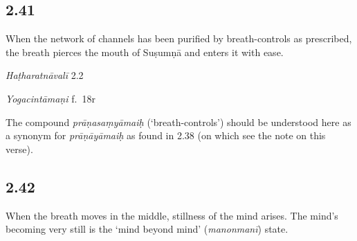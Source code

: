 \begin{ekdosis}
\begin{philcomm}[hp02_040]
\end{philcomm}

\subsection*{2.41}
\begin{translation}[hp02_041]
When the network of channels has been purified by breath-controls as prescribed, the breath pierces the mouth of Suṣumṇā and enters it with ease.
\end{translation}


\begin{testimonia}[hp02_041]
\emph{Haṭharatnāvalī} 2.2

\begin{versinnote}
\end{versinnote}

\emph{Yogacintāmaṇi} f.~18r

\begin{versinnote}
\end{versinnote}


\end{testimonia}

\begin{philcomm}[hp02_041]
The compound \emph{prāṇasaṃyāmaiḥ} (‘breath-controls’) should be understood here as a synonym for \emph{prāṇāyāmaiḥ} as found in 2.38 (on which see the note on this verse).
\end{philcomm}

\subsection*{2.42}
\begin{translation}[hp02_042]
When the breath moves in the middle, stillness of the mind arises. The mind’s becoming very still is the ‘mind beyond mind’ (\emph{manonmanī}) state.
\end{translation}


\end{ekdosis}
